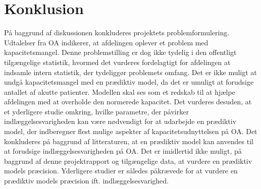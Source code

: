 \section{Konklusion}
På baggrund af diskussionen konkluderes projektets problemformulering. Udtalelser fra OA indikerer, at afdelingen oplever et problem med kapacitetsmangel. Denne problemstilling er dog ikke tydelig i den offentligt tilgængelige statistik, hvormed det vurderes fordelagtigt for afdelingen at indsamle intern statistik, der tydeliggør problemets omfang. 
Det er ikke muligt at undgå kapacitetsmangel med en prædiktiv model, da det er umuligt at forudsige antallet af akutte patienter. Modellen skal ses som et redskab til at hjælpe afdelingen med at overholde den normerede kapacitet.
Det vurderes desuden, at et yderligere studie omkring, hvilke parametre, der påvirker indlæggelsesvarigheden kan være nødvendigt for at udarbejde en prædiktiv model, der indberegner flest mulige aspekter af kapacitetsudnyttelsen på OA.
Det konkluderes på baggrund af litteraturen, at en prædiktiv model kan anvendes til at forudsige indlæggelsesvarigheden på OA. Det er imidlertid ikke muligt, på baggrund af denne projektrapport og tilgængelige data, at vurdere en prædiktiv models præcision. Yderligere studier er således påkrævede for at vurdere en prædiktiv models præcision ift. indlæggelsesvarighed.